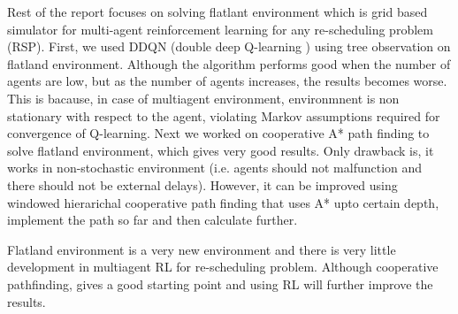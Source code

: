 \vspace{\baselineskip}%
Rest of the report focuses on solving flatlant environment which is grid based simulator for multi-agent
reinforcement learning for any re-scheduling problem (RSP). First, we used DDQN (double deep Q-learning ) using 
tree observation on flatland environment. Although the algorithm performs good when the number of 
agents are low, but as the number of agents increases, the results becomes worse. This is bacause,
in case of multiagent environment, environmnent is non stationary with respect to the agent, violating Markov assumptions required for 
convergence of Q-learning. Next we worked on cooperative A* path finding to solve flatland environment, which gives very good 
results. Only drawback is, it works in non-stochastic environment (i.e. agents should not malfunction and there should 
not be external delays). However, it can be improved using windowed hierarichal cooperative path finding that uses 
A* upto certain depth, implement the path so far and then calculate further. 

\vspace{\baselineskip}
Flatland environment is a very new environment and there is very little development in multiagent RL for 
re-scheduling problem. Although cooperative pathfinding, gives a good starting point and using RL will further 
improve the results.
